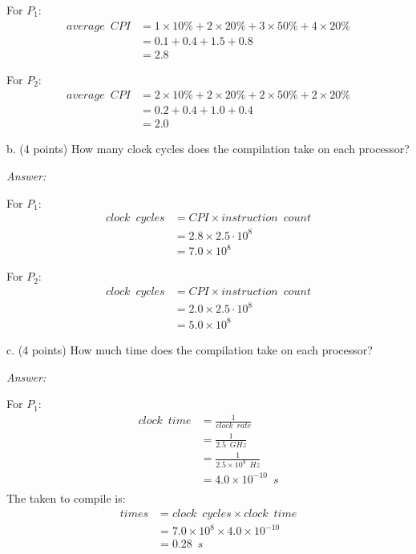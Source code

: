 \documentclass[11pt]{article}
\newcommand{\answer}{{\color{red}\textit{Answer: }}}
\begin{document}
For $P_1$:
\begin{align*}
    average \enspace CPI 
            &= 1 \times 10\% + 2 \times 20\% + 3 \times 50\% + 4 \times 20\%\\
            &= 0.1 + 0.4 + 1.5 + 0.8\\
            &= 2.8
\end{align*}

For $P_2$:
\begin{align*}
    average \enspace CPI 
            &= 2 \times 10\% + 2 \times 20\% + 2 \times 50\% + 2 \times 20\%\\
            &= 0.2 + 0.4 + 1.0 + 0.4\\
            &= 2.0
\end{align*}

b. (4 points) How many clock cycles does the compilation take on each processor?

\answer

For $P_1$:
\begin{align*}
    clock \enspace cycles &= CPI \times instruction \enspace count\\
                          &= 2.8 \times 2.5 \cdot 10^{8}\\
                          &= 7.0 \times 10^{8}
\end{align*}

For $P_2$:
\begin{align*}
    clock \enspace cycles &= CPI \times instruction \enspace count\\
                          &= 2.0 \times 2.5 \cdot 10^{8}\\
                          &= 5.0 \times 10^{8}
\end{align*}


c. (4 points) How much time does the compilation take on each processor?

\answer

For $P_1$:
\begin{align*}
    clock\enspace time &= \frac{1}{clock \enspace rate} \\
                       &= \frac{1}{2.5 \enspace GHz} \\
                       &= \frac{1}{2.5 \times 10^{9} \enspace Hz} \\
                       &= 4.0 \times 10^{-10} \enspace s \\
\end{align*}
The taken to compile is:
\begin{align*}
    times &= clock \enspace cycles \times clock\enspace time\\
          &= 7.0 \times 10^{8} \times 4.0 \times 10^{-10}\\
          &= 0.28 \enspace s
\end{align*}
\end{document}
